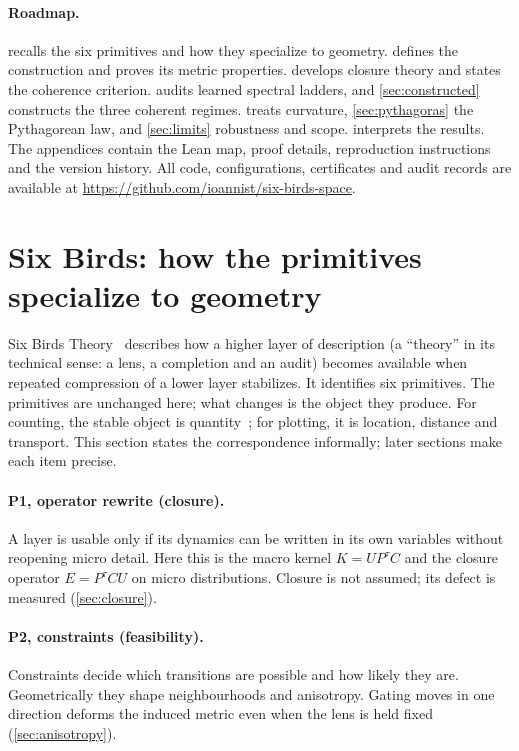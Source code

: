 \documentclass[11pt]{article}
\begin{document}
\paragraph{Roadmap.}
 recalls the six primitives and how they specialize to geometry.
 defines the construction and proves its metric properties.
 develops closure theory and states the coherence criterion.
 audits learned spectral ladders, and \cref{sec:constructed} constructs the three coherent regimes.
 treats curvature, \cref{sec:pythagoras} the Pythagorean law, and \cref{sec:limits} robustness and scope.
 interprets the results.
The appendices contain the Lean map, proof details, reproduction instructions and the version history.
All code, configurations, certificates and audit records are available at \url{https://github.com/ioannist/six-birds-space}.
 \section{Six Birds: how the primitives specialize to geometry}
\label{sec:six-birds}

Six Birds Theory~\cite{SixBirdsTheory} describes how a higher layer of description (a ``theory'' in its technical sense: a lens, a completion and an audit) becomes available when repeated compression of a lower layer stabilizes.
It identifies six primitives.
The primitives are unchanged here; what changes is the object they produce.
For counting, the stable object is quantity~\cite{ToCountAStone}; for plotting, it is location, distance and transport.
This section states the correspondence informally; later sections make each item precise.

\paragraph{P1, operator rewrite (closure).}
A layer is usable only if its dynamics can be written in its own variables without reopening micro detail.
Here this is the macro kernel $K=UP^{\tau}C$ and the closure operator $E=P^{\tau}CU$ on micro distributions.
Closure is not assumed; its defect is measured (\cref{sec:closure}).

\paragraph{P2, constraints (feasibility).}
Constraints decide which transitions are possible and how likely they are.
Geometrically they shape neighbourhoods and anisotropy.
Gating moves in one direction deforms the induced metric even when the lens is held fixed (\cref{sec:anisotropy}).
\end{document}
